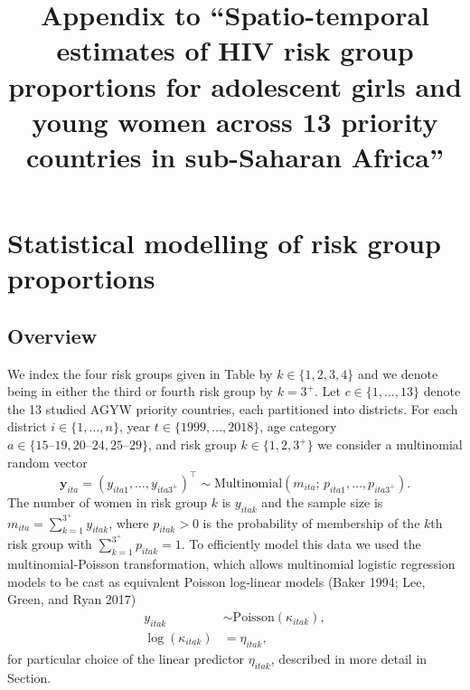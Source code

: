 \documentclass[
]{article}
\title{Appendix to ``Spatio-temporal estimates of HIV risk group
proportions for adolescent girls and young women across 13 priority
countries in sub-Saharan Africa''}
\author{}
\date{\vspace{-2.5em}}
\newcommand{\y}{\mathbf{y}}
\begin{document}
\maketitle

\newpage

\hypertarget{statistical-modelling-of-risk-group-proportions}{%
\section{Statistical modelling of risk group
proportions}\label{statistical-modelling-of-risk-group-proportions}}

\hypertarget{overview}{%
\subsection{Overview}\label{overview}}

We index the four risk groups given in Table by \(k \in \{1, 2, 3, 4\}\)
and we denote being in either the third or fourth risk group by
\(k = 3^{+}\). Let \(c \in \{1, \ldots, 13\}\) denote the 13 studied
AGYW priority countries, each partitioned into districts. For each
district \(i \in \{1, \ldots, n\}\), year
\(t \in \{1999, \ldots, 2018\}\), age category
\(a \in \{\text{15--19}, \text{20--24}, \text{25--29}\}\), and risk
group \(k \in \{1, 2, 3^{+}\}\) we consider a multinomial random vector
\begin{equation}
    \y_{ita} = (y_{ita1}, \ldots, y_{ita3^{+}})^\top \sim \text{Multinomial}(m_{ita}; \, p_{ita1}, \ldots, p_{ita3^{+}}).
\end{equation} The number of women in risk group \(k\) is \(y_{itak}\)
and the sample size is \(m_{ita} = \sum_{k = 1}^{3^{+}} y_{itak}\),
where \(p_{itak} > 0\) is the probability of membership of the \(k\)th
risk group with \(\sum_{k = 1}^{3^{+}} p_{itak} = 1\). To efficiently
model this data we used the multinomial-Poisson transformation, which
allows multinomial logistic regression models to be cast as equivalent
Poisson log-linear models (Baker 1994; Lee, Green, and Ryan 2017)
\begin{align}
    y_{itak} &\sim \text{Poisson}(\kappa_{itak}), \label{eq:poisson} \\
    \log(\kappa_{itak}) &= \eta_{itak}, \label{eq:linearpredictor}
\end{align} for particular choice of the linear predictor
\(\eta_{itak}\), described in more detail in Section.
\end{document}
